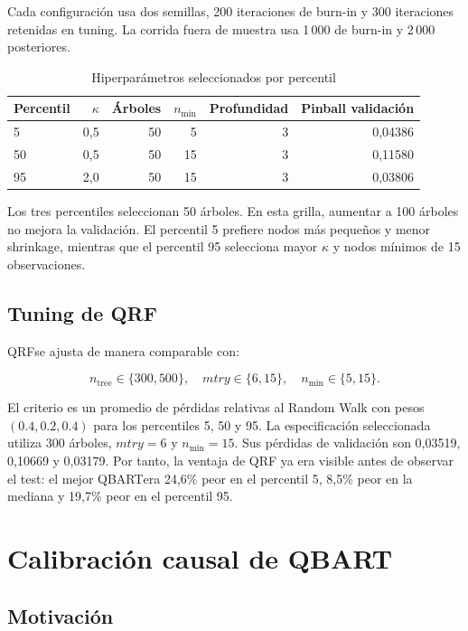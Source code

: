 \documentclass[11pt,a4paper]{article}
\newcommand{\qbart}{\textsc{QBART}}
\newcommand{\qrf}{\textsc{QRF}}
\begin{document}
Cada configuración usa dos semillas, 200 iteraciones de burn-in y 300
iteraciones retenidas en tuning. La corrida fuera de muestra usa 1\,000 de
burn-in y 2\,000 posteriores.

\begin{table}[H]
\centering
\caption{Hiperparámetros seleccionados por percentil}
\label{tab:qbart-tuning}
\begin{tabular}{lrrrrr}
\toprule
Percentil & \(\kappa\) & Árboles & \(n_{\min}\) & Profundidad & Pinball validación \\
\midrule
5  & 0,5 & 50 & 5  & 3 & 0,04386 \\
50 & 0,5 & 50 & 15 & 3 & 0,11580 \\
95 & 2,0 & 50 & 15 & 3 & 0,03806 \\
\bottomrule
\end{tabular}
\end{table}

Los tres percentiles seleccionan 50 árboles. En esta grilla, aumentar a 100
árboles no mejora la validación. El percentil 5 prefiere nodos más pequeños
y menor shrinkage, mientras que el percentil 95 selecciona mayor
\(\kappa\) y nodos mínimos de 15 observaciones.

\subsection{Tuning de QRF}

\qrf se ajusta de manera comparable con:

\begin{equation}
  n_{\text{tree}}\in\{300,500\},\quad
  mtry\in\{6,15\},\quad
  n_{\min}\in\{5,15\}.
\end{equation}

El criterio es un promedio de pérdidas relativas al Random Walk con pesos
\((0.4,0.2,0.4)\) para los percentiles 5, 50 y 95. La especificación
seleccionada utiliza 300 árboles, \(mtry=6\) y \(n_{\min}=15\). Sus pérdidas
de validación son 0,03519, 0,10669 y 0,03179. Por tanto, la ventaja de \qrf
ya era visible antes de observar el test: el mejor \qbart era 24,6\% peor
en el percentil 5, 8,5\% peor en la mediana y 19,7\% peor en el percentil
95.

\section{Calibración causal de QBART}

\subsection{Motivación}
\end{document}
